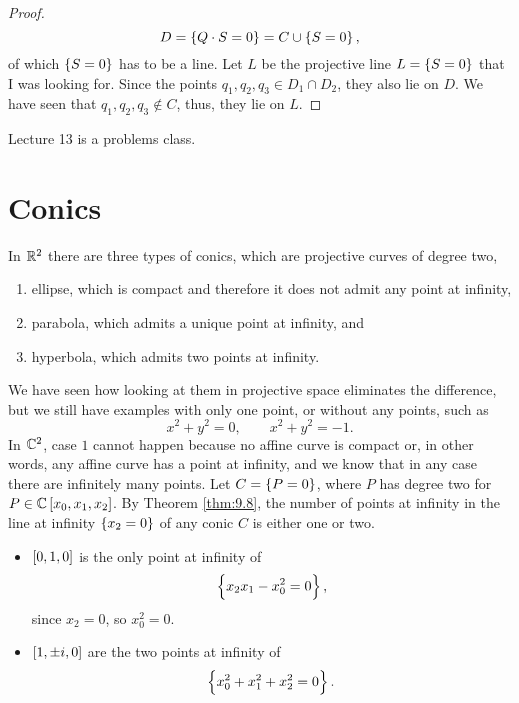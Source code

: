 \begin{proof}
$$ D = \cbr{Q \cdot S = 0} = C \cup \cbr{S = 0}, $$
of which $ \cbr{S = 0} $ has to be a line. Let $ L $ be the projective line $ L = \cbr{S = 0} $ that I was looking for. Since the points $ q_1, q_2, q_3 \in D_1 \cap D_2 $, they also lie on $ D $. We have seen that $ q_1, q_2, q_3 \notin C $, thus, they lie on $ L $.
\end{proof}


Lecture 13 is a problems class.

\pagebreak

\section{Conics}


In $ \mathbb{R}^2 $ there are three types of conics, which are projective curves of degree two,
\begin{enumerate}
\item ellipse, which is compact and therefore it does not admit any point at infinity,
\item parabola, which admits a unique point at infinity, and
\item hyperbola, which admits two points at infinity.
\end{enumerate}
We have seen how looking at them in projective space eliminates the difference, but we still have examples with only one point, or without any points, such as
$$ x^2 + y^2 = 0, \qquad x^2 + y^2 = -1. $$
In $ \mathbb{C}^2 $, case $ 1 $ cannot happen because no affine curve is compact or, in other words, any affine curve has a point at infinity, and we know that in any case there are infinitely many points. Let $ C = \cbr{P = 0} $, where $ P $ has degree two for $ P \in \CC\sbr{x_0, x_1, x_2} $. By Theorem \ref{thm:9.8}, the number of points at infinity in the line at infinity $ \cbr{x_2 = 0} $ of any conic $ C $ is either one or two.

\begin{example}
\hfill
\begin{itemize}
\item $ \sbr{0, 1, 0} $ is the only point at infinity of
$$ \cbr{x_2x_1 - x_0^2 = 0}, $$
since $ x_2 = 0 $, so $ x_0^2 = 0 $.
\item $ \sbr{1, \pm i, 0} $ are the two points at infinity of
$$ \cbr{x_0^2 + x_1^2 + x_2^2 = 0}. $$
\end{itemize}
\end{example}


